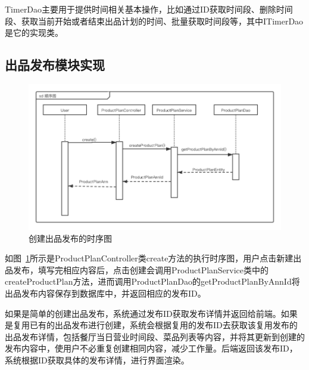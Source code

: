 TimerDao主要用于提供时间相关基本操作，比如通过ID获取时间段、删除时间段、获取当前开始或者结束出品计划的时间、批量获取时间段等，其中ITimerDao是它的实现类。\\

\subsection{出品发布模块实现}

\begin{figure}[htbp!]
    \centering
    \includegraphics[width=\linewidth]{FIGs/chapter4/dish_time.pdf}
    \caption{创建出品发布的时序图}\label{fig_dish_time}
\end{figure}

如图~\ref{fig_dish_time}所示是ProductPlanController类create方法的执行时序图，用户点击新建出品发布，填写完相应内容后，点击创建会调用ProductPlanService类中的createProductPlan方法，进而调用ProductPlanDao的getProductPlanByAnnId将出品发布内容保存到数据库中，并返回相应的发布ID。

如果是简单的创建出品发布，系统通过发布ID获取发布详情并返回给前端。如果是复用已有的出品发布进行创建，系统会根据复用的发布ID去获取该复用发布的出品发布详情，包括餐厅当日营业时间段、菜品列表等内容，并将其更新到创建的发布内容中，使用户不必重复创建相同内容，减少工作量。后端返回该发布ID，系统根据ID获取具体的发布详情，进行界面渲染。

